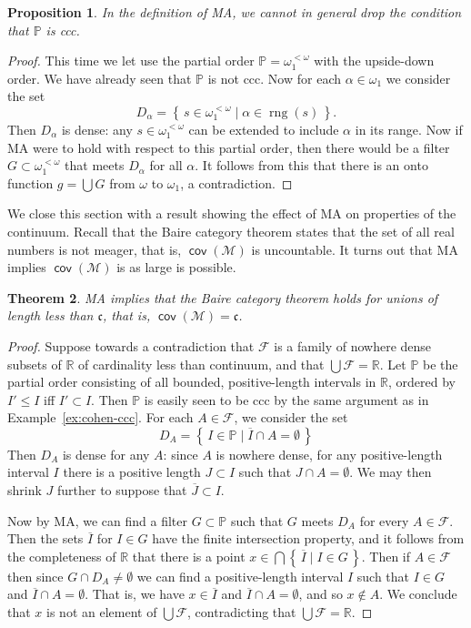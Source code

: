 \documentclass[11pt,oneside]{amsbook}
\newcommand{\set}[1]{\left\{\,#1\,\right\}}
\newcommand{\PP}{\mathbb P}
\newcommand{\RR}{\mathbb R}
\newcommand{\Meager}{\mathcal M}
\DeclareMathOperator{\rng}{rng}
\DeclareMathOperator{\cov}{\mathsf{cov}}
\theoremstyle{definition}
\theoremstyle{plain}
\newtheorem{thm}{Theorem}[section]
\newtheorem{prop}[thm]{Proposition}
\theoremstyle{definition}
\theoremstyle{remark}
\begin{document}
\begin{prop}
  In the definition of MA, we cannot in general drop the condition that $\PP$ is ccc.
\end{prop}

\begin{proof}
  This time we let use the partial order $\PP=\omega_1^{<\omega}$ with the upside-down order. We have already seen that $\PP$ is not ccc. Now for each $\alpha\in\omega_1$ we consider the set
  \[D_\alpha=\set{s\in\omega_1^{<\omega}\mid\alpha\in\rng(s)}\text{.}
  \]
  Then $D_\alpha$ is dense: any $s\in\omega_1^{<\omega}$ can be extended to include $\alpha$ in its range. Now if MA were to hold with respect to this partial order, then there would be a filter $G\subset\omega_1^{<\omega}$ that meets $D_\alpha$ for all $\alpha$. It follows from this that there is an onto function $g=\bigcup G$ from $\omega$ to $\omega_1$, a contradiction.
\end{proof}

We close this section with a result showing the effect of MA on properties of the continuum. Recall that the Baire category theorem states that the set of all real numbers is not meager, that is, $\cov(\Meager)$ is uncountable. It turns out that MA implies $\cov(\Meager)$ is as large is possible.

\begin{thm}
  \label{thm:ma-covm}
  MA implies that the Baire category theorem holds for unions of length less than $\mathfrak c$, that is, $\cov(\Meager)=\mathfrak c$.
\end{thm}

\begin{proof}
  Suppose towards a contradiction that $\mathcal F$ is a family of nowhere dense subsets of $\RR$ of cardinality less than continuum, and that $\bigcup\mathcal F=\RR$. Let $\PP$ be the partial order consisting of all bounded, positive-length intervals in $\RR$, ordered by $I'\leq I$ iff $I'\subset I$. Then $\PP$ is easily seen to be ccc by the same argument as in Example~\ref{ex:cohen-ccc}. For each $A\in\mathcal F$, we consider the set
  \[D_A=\set{I\in\PP\mid \overline{I}\cap A=\emptyset}
  \]
  Then $D_A$ is dense for any $A$: since $A$ is nowhere dense, for any positive-length interval $I$ there is a positive length $J\subset I$ such that $J\cap A=\emptyset$. We may then shrink $J$ further to suppose that $\overline{J}\subset I$.

  Now by MA, we can find a filter $G\subset\PP$ such that $G$ meets $D_A$ for every $A\in\mathcal F$. Then the sets $\overline{I}$ for $I\in G$ have the finite intersection property, and it follows from the completeness of $\RR$ that there is a point $x\in\bigcap\set{\overline{I}\mid I\in G}$. Then if $A\in\mathcal F$ then since $G\cap D_A\neq\emptyset$ we can find a positive-length interval $I$ such that $I\in G$ and $\overline{I}\cap A=\emptyset$. That is, we have $x\in\overline{I}$ and $\overline{I}\cap A=\emptyset$, and so $x\notin A$. We conclude that $x$ is not an element of $\bigcup\mathcal F$, contradicting that $\bigcup\mathcal F=\RR$.
\end{proof}
\end{document}
